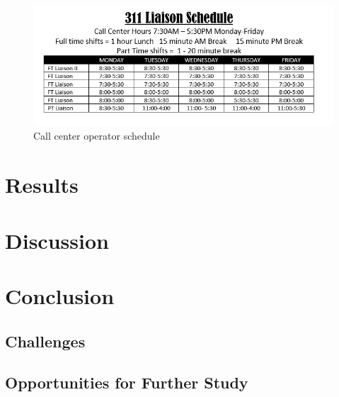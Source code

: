 \documentclass[12pt,twocolumn]{article}
\begin{document}
	\begin{figure}[h]
	\includegraphics[scale=.35]{schedule2.jpg}
	\caption{Call center operator schedule}
	\end{figure}

\section{Results}

\section{Discussion}


\section{Conclusion}

	\subsection{Challenges}

	\subsection{Opportunities for Further Study}
\end{document}
